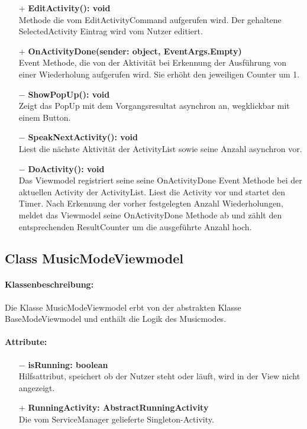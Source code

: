 \documentclass[a4paper,12pt]{article}
\begin{document}
\begin{itemize}
	\item[+] \textbf{EditActivity(): void} \\ Methode die vom EditActivityCommand aufgerufen wird. Der gehaltene SelectedActivity Eintrag wird vom Nutzer editiert.
	\item[+] \textbf{ OnActivityDone(sender: object, EventArgs.Empty)} \\ Event Methode, die von der Aktivität bei Erkennung der Ausführung von einer Wiederholung aufgerufen wird. Sie erhöht den jeweiligen Counter um 1.  
	\item[$-$] \textbf{ShowPopUp(): void} \\ Zeigt das PopUp mit dem Vorgangsresultat asynchron an, wegklickbar mit einem Button. 
	\item[$-$] \textbf{SpeakNextActivity(): void} \\ Liest die nächste Aktivität der ActivityList sowie seine Anzahl asynchron vor. 
	\item[$-$] \textbf{DoActivity(): void} \\ Das Viewmodel registriert seine seine OnActivityDone Event Methode bei der aktuellen Activity der ActivityList. Liest die Activity vor und startet den Timer. Nach Erkennung der vorher festgelegten Anzahl Wiederholungen, meldet das Viewmodel seine OnActivityDone Methode ab und zählt den entsprechenden ResultCounter um die ausgeführte Anzahl hoch. 
\end{itemize}

\subsection{Class MusicModeViewmodel}
\paragraph{Klassenbeschreibung:}
Die Klasse MusicModeViewmodel erbt von der abstrakten Klasse BaseModeViewmodel und enthält die Logik des Musicmodes.
\paragraph{Attribute:}
\begin{itemize}
	\item[$-$] \textbf{isRunning: boolean} \\ Hilfsattribut, speichert ob der Nutzer steht oder läuft, wird in der View nicht angezeigt.
	\item[+] \textbf{RunningActivity: AbstractRunningActivity} \\ Die vom ServiceManager gelieferte Singleton-Activity.
\end{itemize}
\end{document}
